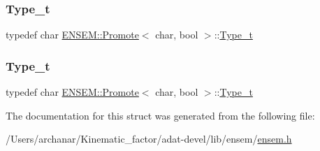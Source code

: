 \subsubsection{\texorpdfstring{Type\_t}{Type\_t}\hspace{0.1cm}{\footnotesize\ttfamily [2/3]}}
{\footnotesize\ttfamily typedef char \mbox{\hyperlink{structENSEM_1_1Promote}{E\+N\+S\+E\+M\+::\+Promote}}$<$ char, bool $>$\+::\mbox{\hyperlink{structENSEM_1_1Promote_3_01char_00_01bool_01_4_ad5b22f8f15e29245a56d9411fafedb3b}{Type\+\_\+t}}}

\mbox{\label{structENSEM_1_1Promote_3_01char_00_01bool_01_4_ad5b22f8f15e29245a56d9411fafedb3b}} 
\subsubsection{\texorpdfstring{Type\_t}{Type\_t}\hspace{0.1cm}{\footnotesize\ttfamily [3/3]}}
{\footnotesize\ttfamily typedef char \mbox{\hyperlink{structENSEM_1_1Promote}{E\+N\+S\+E\+M\+::\+Promote}}$<$ char, bool $>$\+::\mbox{\hyperlink{structENSEM_1_1Promote_3_01char_00_01bool_01_4_ad5b22f8f15e29245a56d9411fafedb3b}{Type\+\_\+t}}}



The documentation for this struct was generated from the following file\+:\begin{DoxyCompactItemize}
\item 
/\+Users/archanar/\+Kinematic\+\_\+factor/adat-\/devel/lib/ensem/\mbox{\hyperlink{adat-devel_2lib_2ensem_2ensem_8h}{ensem.\+h}}\end{DoxyCompactItemize}
